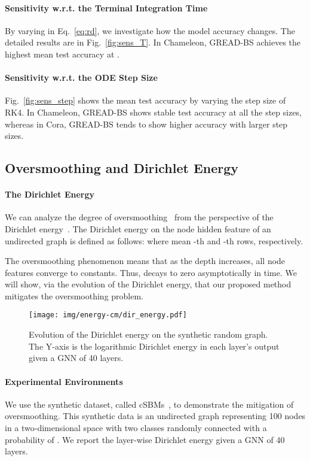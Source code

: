 \documentclass{article}
\theoremstyle{plain}
\theoremstyle{definition}
\theoremstyle{remark}
\begin{document}
\paragraph{Sensitivity w.r.t. the Terminal Integration Time }
By varying  in Eq.~\eqref{eq:rd}, we investigate how the model accuracy changes. The detailed results are in Fig.~\ref{fig:sens_T}. In Chameleon, GREAD-BS achieves the highest mean test accuracy at . 

\paragraph{Sensitivity w.r.t. the ODE Step Size }
Fig.~\ref{fig:sens_step} shows the mean test accuracy by varying the step size  of RK4.
In Chameleon, GREAD-BS shows stable test accuracy at all the step sizes, whereas in Cora, GREAD-BS tends to show higher accuracy with larger step sizes.

\subsection{Oversmoothing and Dirichlet Energy}
\paragraph{The Dirichlet Energy} We can analyze the degree of oversmoothing~\cite{nt2019revisiting,oono2020oversmoothing} from the perspective of the Dirichlet energy~\cite{rusch2022gcon,rusch2023survey}. The Dirichlet energy  on the node hidden feature  of an undirected graph  is defined as follows:
 where  mean -th and -th rows, respectively.

The oversmoothing phenomenon means that as the depth increases, all node features converge to constants. Thus,  decays to zero asymptotically in time. We will show, via the evolution of the Dirichlet energy, that our proposed method mitigates the oversmoothing problem.

\begin{figure}[t]
    \centering
    \texttt{[image: img/energy-cm/dir\_energy.pdf]}
    \caption{Evolution of the Dirichlet energy on the synthetic random graph. The Y-axis is the logarithmic Dirichlet energy in each layer’s output given a GNN of 40 layers.}
    \label{fig:energy}
\end{figure}

\paragraph{Experimental Environments} We use the synthetic dataset, called cSBMs~\cite{Deshpande2018cSBM}, to demonstrate the mitigation of oversmoothing. This synthetic data is an undirected graph representing 100 nodes in a two-dimensional space with two classes randomly connected with a probability of . We report the layer-wise Dirichlet energy given a GNN of 40 layers.
\end{document}
